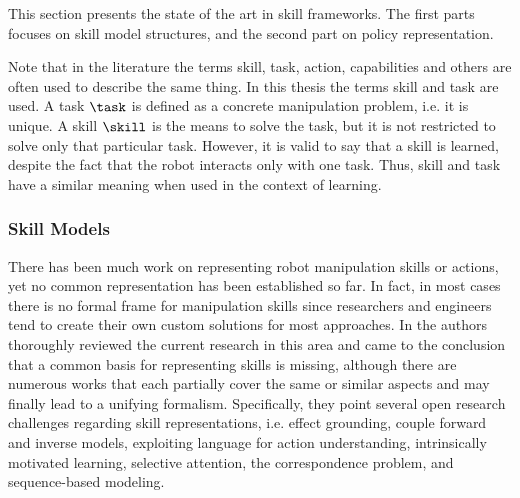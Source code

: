 This section presents the state of the art in skill frameworks.
The first parts focuses on skill model structures, and the second part on policy representation.

Note that in the literature the terms skill, task, action, capabilities and others are often used to describe the same thing.
In this thesis the terms skill and task are used.
A task $\task$ is defined as a concrete manipulation problem, i.e. it is unique.
A skill $\skill$ is the means to solve the task, but it is not restricted to solve only that particular task.
However, it is valid to say that a skill is learned, despite the fact that the robot interacts only with one task.
Thus, skill and task have a similar meaning when used in the context of learning.

\subsubsection{Skill Models}

There has been much work on representing robot manipulation skills or actions, yet no common representation has been established so far. In fact, in most cases there is no formal frame for manipulation skills since researchers and engineers tend to create their own custom solutions for most approaches. In \cite{Zech.2019} the authors thoroughly reviewed the current research in this area and came to the conclusion that a common basis for representing skills is missing, although there are numerous works that each partially cover the same or similar aspects and may finally lead to a unifying formalism.
Specifically, they point several open research challenges regarding skill representations, i.e. effect grounding, couple forward and inverse models, exploiting language for action understanding, intrinsically motivated learning, selective attention, the correspondence problem, and sequence-based modeling.

